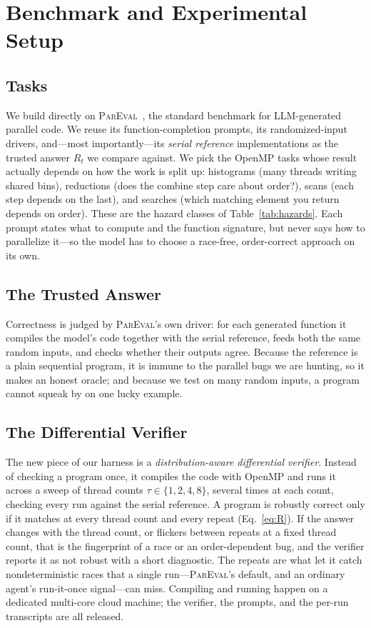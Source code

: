 \section{Benchmark and Experimental Setup}
\label{sec:setup}

\subsection{Tasks}
We build directly on \textsc{ParEval}~\cite{pareval}, the standard benchmark for
LLM-generated parallel code. We reuse its function-completion prompts, its
randomized-input drivers, and---most importantly---its \emph{serial reference}
implementations as the trusted answer $R_t$ we compare against. We pick the OpenMP tasks
whose result actually depends on how the work is split up: histograms (many threads
writing shared bins), reductions (does the combine step care about order?), scans (each
step depends on the last), and searches (which matching element you return depends on
order). These are the hazard classes of Table~\ref{tab:hazards}. Each prompt states what
to compute and the function signature, but never says how to parallelize it---so the model
has to choose a race-free, order-correct approach on its own.

\subsection{The Trusted Answer}
Correctness is judged by \textsc{ParEval}'s own driver: for each generated function it
compiles the model's code together with the serial reference, feeds both the same random
inputs, and checks whether their outputs agree. Because the reference is a plain sequential
program, it is immune to the parallel bugs we are hunting, so it makes an honest oracle;
and because we test on many random inputs, a program cannot squeak by on one lucky example.

\subsection{The Differential Verifier}
The new piece of our harness is a \emph{distribution-aware differential verifier}. Instead
of checking a program once, it compiles the code with OpenMP and runs it across a sweep of
thread counts $\tau\in\{1,2,4,8\}$, several times at each count, checking every run against
the serial reference. A program is robustly correct only if it matches at every thread
count and every repeat (Eq.~\ref{eq:R}). If the answer changes with the thread count, or
flickers between repeats at a fixed thread count, that is the fingerprint of a race or an
order-dependent bug, and the verifier reports it as not robust with a short diagnostic. The
repeats are what let it catch nondeterministic races that a single run---\textsc{ParEval}'s
default, and an ordinary agent's run-it-once signal---can miss. Compiling and running happen
on a dedicated multi-core cloud machine; the verifier, the prompts, and the per-run
transcripts are all released.

